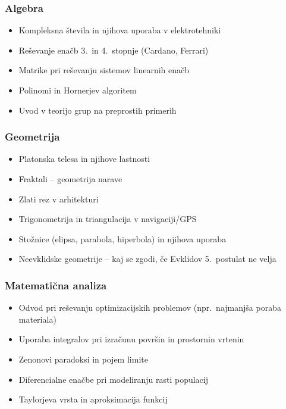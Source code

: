 \documentclass[11pt,a4paper]{article}
\begin{document}
\subsubsection*{Algebra}
\begin{itemize}
  \item Kompleksna števila in njihova uporaba v elektrotehniki
  \item Reševanje enačb 3.\ in 4.\ stopnje (Cardano, Ferrari)
  \item Matrike pri reševanju sistemov linearnih enačb
  \item Polinomi in Hornerjev algoritem
  \item Uvod v teorijo grup na preprostih primerih
\end{itemize}

\subsubsection*{Geometrija}
\begin{itemize}
  \item Platonska telesa in njihove lastnosti
  \item Fraktali -- geometrija narave
  \item Zlati rez v arhitekturi
  \item Trigonometrija in triangulacija v navigaciji/GPS
  \item Stožnice (elipsa, parabola, hiperbola) in njihova uporaba
  \item Neevklidske geometrije -- kaj se zgodi, če Evklidov 5.\ postulat ne velja
\end{itemize}

\subsubsection*{Matematična analiza}
\begin{itemize}
  \item Odvod pri reševanju optimizacijskih problemov (npr.\ najmanjša poraba materiala)
  \item Uporaba integralov pri izračunu površin in prostornin vrtenin
  \item Zenonovi paradoksi in pojem limite
  \item Diferencialne enačbe pri modeliranju rasti populacij
  \item Taylorjeva vrsta in aproksimacija funkcij
\end{itemize}
\end{document}
